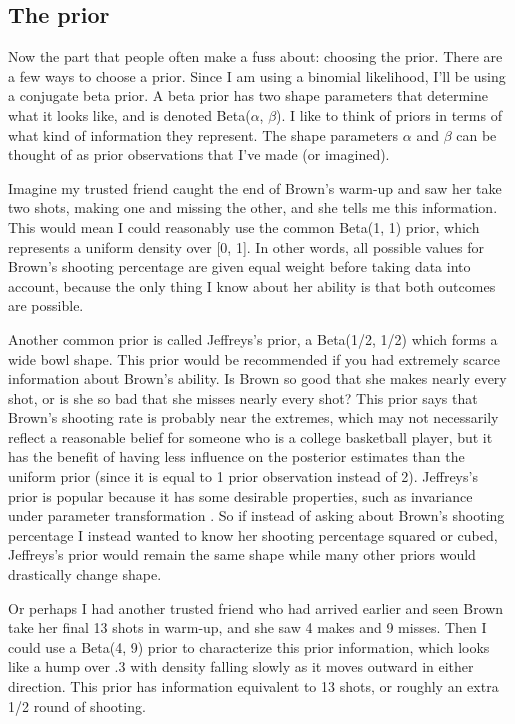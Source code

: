 \FloatBarrier


\subsection{The prior}

Now the part that people often make a fuss about: choosing the prior. There are a few ways to choose a prior. Since I am using a binomial likelihood, I'll be using a conjugate beta prior. A beta prior has two shape parameters that determine what it looks like, and is denoted Beta($\alpha$, $\beta$). I like to think of priors in terms of what kind of information they represent. The shape parameters $\alpha$ and $\beta$ can be thought of as prior observations that I've made (or imagined).

Imagine my trusted friend caught the end of Brown's warm-up and saw her take two shots, making one and missing the other, and she tells me this information. This would mean I could reasonably use the common Beta(1, 1) prior, which represents a uniform density over [0, 1]. In other words, all possible values for Brown's shooting percentage are given equal weight before taking data into account, because the only thing I know about her ability is that both outcomes are possible\cite{LeeWagenmakers2005}.

Another common prior is called Jeffreys's prior, a Beta(1/2, 1/2) which forms a wide bowl shape. This prior would be recommended if you had extremely scarce information about Brown's ability. Is Brown so good that she makes nearly every shot, or is she so bad that she misses nearly every shot? This prior says that Brown's shooting rate is probably near the extremes, which may not necessarily reflect a reasonable belief for someone who is a college basketball player, but it has the benefit of having less influence on the posterior estimates than the uniform prior (since it is equal to 1 prior observation instead of 2). Jeffreys's prior is popular because it has some desirable properties, such as invariance under parameter transformation \cite{Jaynes2003}. So if instead of asking about Brown's shooting percentage I instead wanted to know her shooting percentage squared or cubed, Jeffreys's prior would remain the same shape while many other priors would drastically change shape.

Or perhaps I had another trusted friend who had arrived earlier and seen Brown take her final 13 shots in warm-up, and she saw 4 makes and 9 misses. Then I could use a Beta(4, 9) prior to characterize this prior information, which looks like a hump over .3 with density falling slowly as it moves outward in either direction. This prior has information equivalent to 13 shots, or roughly an extra 1/2 round of shooting.


